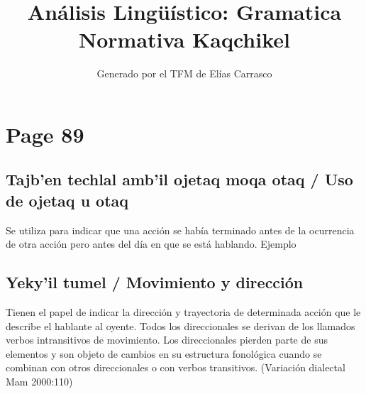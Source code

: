 \documentclass{article}%
\title{Análisis Lingüístico: Gramatica Normativa Kaqchikel}%
\author{Generado por el TFM de Elías Carrasco}%
\begin{document}
%
\normalsize%
\maketitle%
\section{Page 89}%
\label{sec:Page89}%
\subsection{Tajb’en techlal amb’il ojetaq moqa otaq / Uso de ojetaq u otaq}%
\label{subsec:Tajbentechlalambilojetaqmoqaotaq/Usodeojetaquotaq}%

%
Se utiliza para indicar que una acción se había terminado antes %
de la ocurrencia de otra acción pero antes del día en que se %
está hablando. %
Ejemplo %
\subsection{Yeky’il tumel / Movimiento y dirección}%
\label{subsec:Yekyiltumel/Movimientoydireccin}%

%
Tienen el papel de indicar la dirección y trayectoria de determinada acción que le describe el hablante al oyente. Todos los direccionales se derivan de los llamados verbos intransitivos de movimiento. Los direccionales pierden parte de sus elementos y son objeto de cambios en su estructura fonológica cuando se combinan con otros direccionales o con verbos transitivos. (Variación dialectal Mam 2000:110) 

%
\end{document}
